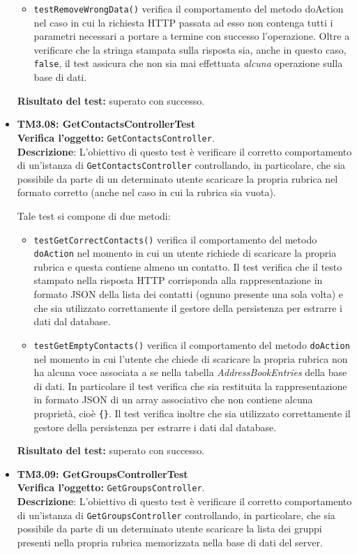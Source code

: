\begin{itemize}
\begin{itemize}
\item \texttt{testRemoveWrongData()} verifica il comportamento del metodo doAction nel caso in cui la richiesta HTTP passata ad esso non contenga tutti i parametri necessari a portare a termine con successo l'operazione. Oltre a verificare che la stringa stampata sulla risposta sia, anche in questo caso, \texttt{false}, il test assicura che non sia mai effettuata \textit{alcuna} operazione sulla base di dati.
\end{itemize}
\textbf{Risultato del test:} superato con successo.


\item \textbf{TM3.08: GetContactsControllerTest}\\
\textbf{Verifica l'oggetto:} \texttt{GetContactsController}.\\
\textbf{Descrizione}: L'obiettivo di questo test è verificare il corretto comportamento di un'istanza di \texttt{GetContactsController} controllando, in particolare, che sia possibile da parte di un determinato utente scaricare la propria rubrica nel formato corretto (anche nel caso in cui la rubrica sia vuota).

Tale test si compone di due metodi:
\begin{itemize}
\item \texttt{testGetCorrectContacts()} verifica il comportamento del metodo \texttt{doAction} nel momento in cui un utente richiede di scaricare la propria rubrica e questa contiene almeno un contatto. Il test verifica che il testo stampato nella risposta HTTP corrisponda alla rappresentazione in formato JSON della lista dei contatti (ognuno presente una sola volta) e che sia utilizzato correttamente il gestore della persistenza per estrarre i dati dal database.

\item \texttt{testGetEmptyContacts()} verifica il comportamento del metodo \texttt{doAction} nel momento in cui l'utente che chiede di scaricare la propria rubrica non ha alcuna voce associata a se nella tabella \textit{AddressBookEntries} della base di dati. In particolare il test verifica che sia restituita la rappresentazione in formato JSON di un array associativo che non contiene alcuna proprietà, cioè \texttt{\{\}}. Il test verifica inoltre che sia utilizzato correttamente il gestore della persistenza per estrarre i dati dal database.
\end{itemize}
\textbf{Risultato del test:} superato con successo.


\item \textbf{TM3.09: GetGroupsControllerTest}\\
\textbf{Verifica l'oggetto:} \texttt{GetGroupsController}.\\
\textbf{Descrizione}: L'obiettivo di questo test è verificare il corretto comportamento di un'istanza di \texttt{GetGroupsController} controllando, in particolare, che sia possibile da parte di un determinato utente scaricare la lista dei gruppi presenti nella propria rubrica memorizzata nella base di dati del server.


\end{itemize}
